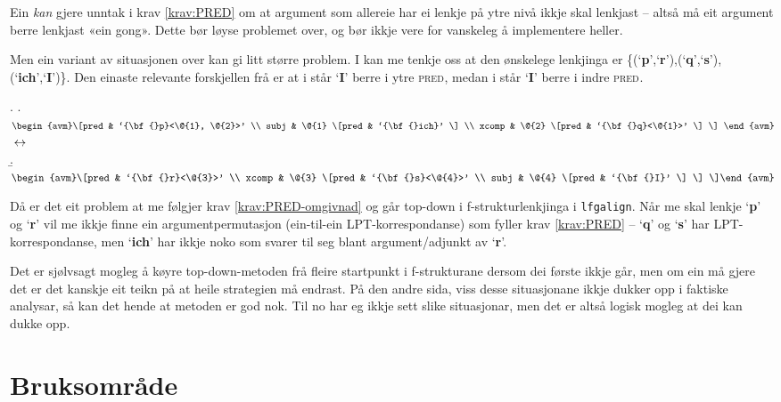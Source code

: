 \documentclass[11pt,a4paper,oneside,draft]{report}
\newcommand{\F}[2]{\textsc{#1}\ensuremath{_{#2}}}
\newcommand{\PRED}{\F{pred}{}}
\newcommand{\p}[1]{`\textbf{#1}'}
\begin{document}
 Ein \emph{kan} gjere unntak i krav \ref{krav:PRED} om at argument som
 allereie har ei lenkje på ytre nivå ikkje skal lenkjast -- altså må
 eit argument berre lenkjast «ein gong». Dette bør løyse problemet
 over, og bør ikkje vere for vanskeleg å implementere heller.

 Men ein variant av situasjonen over kan gi litt større problem. I
 \Next kan me tenkje oss at den ønskelege lenkjinga er
 \{(\p{p},\p{r}),(\p{q},\p{s}),(\p{ich},\p{I})\}. Den einaste
 relevante forskjellen frå \Last er at i \Last står \p{I} berre i ytre
 \PRED, medan i \Next står \p{I} berre i indre \PRED.

{\avmoptions{}
\ex. \a. $\begin{avm}\[pred & `{\bf{}p}<\@{1}, \@{2}>'  \\
     subj & \@{1} \[pred &  `{\bf{}ich}' \] \\
     xcomp & \@{2} \[pred & `{\bf{}q}<\@{1}>' \] \] \end{avm}$
     $\\\\\leftrightarrow$\\
     \b. $\begin{avm}\[pred & `{\bf{}r}<\@{3}>' \\
     xcomp & \@{3} \[pred & `{\bf{}s}<\@{4}>' \\
     subj & \@{4} \[pred &  `{\bf{}I}' \] \] \]\end{avm}$

}

 Då er det eit problem at me følgjer krav \ref{krav:PRED-omgivnad} og
 går top-down i f-strukturlenkjinga i \texttt{lfgalign}. Når me skal lenkje
 \p{p} og \p{r} vil me ikkje finne ein argumentpermutasjon
 (ein-til-ein LPT-korrespondanse) som fyller krav \ref{krav:PRED} --
 \p{q} og \p{s} har LPT-korrespondanse, men \p{ich} har ikkje noko som
 svarer til seg blant argument/adjunkt av \p{r}.

 Det er sjølvsagt mogleg å køyre top-down-metoden frå fleire
 startpunkt i f-strukturane dersom dei første ikkje går, men om ein må
 gjere det er det kanskje eit teikn på at heile strategien må
 endrast. På den andre sida, viss desse situasjonane ikkje dukker opp
 i faktiske analysar, så kan det hende at metoden er god nok. Til no
 har eg ikkje sett slike situasjonar, men det er altså logisk mogleg
 at dei kan dukke opp.
\section{Bruksområde}
\label{sec-5.5}
\end{document}
